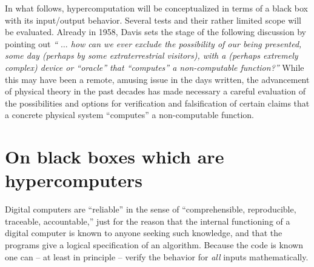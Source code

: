\documentclass[12pt]{article}
\begin{document}
In what follows, hypercomputation will be conceptualized in terms of a black box with its input/output behavior.
Several tests and their rather limited scope will be evaluated.
Already in 1958, Davis \cite[p. 11]{davis-58}
sets the stage of the following discussion by pointing out
 {\em `` $\ldots$ how can we ever exclude the possibility of our being presented,
 some day (perhaps by some extraterrestrial visitors), with a (perhaps
 extremely complex) device or ``oracle'' that ``computes'' a
 non-computable function?''}
While this may have been a remote, amusing issue in the days written,
the advancement of physical theory in the past decades
has made necessary
a careful evaluation of the possibilities and options for
verification and falsification of certain claims that a concrete physical system
``computes''   a  non-computable function.



\section{On black boxes which are hypercomputers}

Digital computers  are ``reliable'' in the sense of ``comprehensible, reproducible, traceable, accountable,''
just for the reason that the internal functioning of a
digital computer is known to anyone seeking such knowledge, and that the programs give a logical
specification of an algorithm. Because the code is known one can -- at least in
principle -- verify the behavior for {\em all} inputs mathematically.
\end{document}
